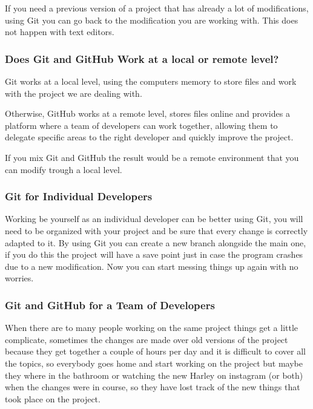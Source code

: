 \documentclass{article}
\begin{document}
	If you need a previous version of a project that has already a lot of modifications, using Git you can go back to the modification you are working with. This does not happen with text editors.
	
	\subsubsection{Does Git and GitHub Work at a local or remote level?}
	
	Git works at a local level, using the computers memory to store files and work with the project we are dealing with.\par
	
	Otherwise, GitHub works at a remote level, stores files online and provides a platform where a team of developers can work together, allowing them to delegate specific areas to the right developer and quickly improve the project.\par

    If you mix Git and GitHub the result would be a remote environment that you can modify trough a local level.
    
    \subsubsection{Git for Individual Developers}
    
    Working be yourself as an individual developer can be better using Git, you will need to be organized with your project and be sure that every change is correctly adapted to it. By using Git you can create a new branch alongside the main one, if you do this the project will have a save point just in case the program crashes due to a new modification. Now you can start messing things up again with no worries.
    
    \subsubsection{Git and GitHub for a Team of Developers}
    
    When there are to many people working on the same project things get a little complicate, sometimes the changes are made over old versions of the project because they get together a couple of hours per day and it is difficult to cover all the topics, so everybody goes home and start working on the project but maybe they where in the bathroom or watching the new Harley on instagram (or both) when the changes were in course, so they have lost track of the new things that took place on the project.\par
    
\end{document}
